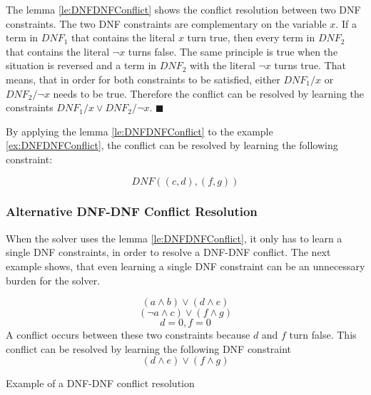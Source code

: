 The lemma \ref{le:DNFDNFConflict} shows the conflict resolution between two DNF constraints. The two DNF constraints are complementary on the variable $x$. If a term in $DNF_1$ that contains the literal $x$ turn true, then every term in $DNF_2$ that contains the literal $\neg x$ turns false. The same principle is true when the situation is reversed and a term in $DNF_2$ with the literal $\neg x$ turns true. That means, that in order for both constraints to be satisfied, either $DNF_1/x$ or $DNF_2/\neg x$ needs to be true. Therefore the conflict can be resolved by learning the constraints $DNF_1 / x \vee DNF_2 / \neg x$. $\blacksquare$

By applying the lemma \ref{le:DNFDNFConflict} to the example \ref{ex:DNFDNFConflict}, the conflict can be resolved by learning the following constraint:
\begin{leftbar}
\begin{displaymath}
 DNF ((c,d),(f,g))
\end{displaymath}
\end{leftbar}

\subsubsection{Alternative DNF-DNF Conflict Resolution}

When the solver uses the lemma \ref{le:DNFDNFConflict}, it only has to learn a single DNF constraints, in order to resolve a DNF-DNF conflict. The next example shows, that even learning a single DNF constraint can be an unnecessary burden for the solver.

\begin{example}
\begin{leftbar}
\begin{displaymath}
(a \wedge b) \vee (d \wedge e)
\end{displaymath}
\begin{displaymath}
(\neg a \wedge c) \vee (f \wedge g)
\end{displaymath}
\begin{displaymath}
d = 0, f = 0
\end{displaymath}
A conflict occurs between these two constraints because $d$ and $f$ turn false. This conflict can be resolved by learning the following DNF constraint
\begin{displaymath}
(d \wedge e) \vee (f \wedge g)
\end{displaymath}
\end{leftbar}
\caption{Example of a DNF-DNF conflict resolution}
\label{ex:DNFDNFConflictResolution}
\end{example}

